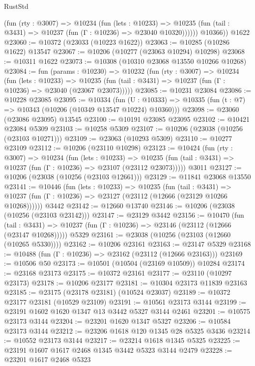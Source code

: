 \begin{lexlean}{RustStd}
\begin{coremodule}
            (fun (rty : @3007) =>
            @10234
              (fun (lets : @10233) =>
              @10235 (fun (tail : @3431) => @10237 (fun (Γ : @10236) => @23040 @10320))))))
        @10366))
    @1622
@23060 := @10372 (@23033 (@10223 @1622))
@23063 := @10285 (@10286 @1622) @13547
@23067 := @10206 (@10277 (@23063 @10294) @10298)
@23068 := @10311 @1622
@23073 := @10308 (@10310 @23068 @13550 @10266 @10268)
@23084 := fun (params : @10230) =>
  @10232
    (fun (rty : @3007) =>
    @10234
      (fun (lets : @10233) =>
      @10235 (fun (tail : @3431) => @10237 (fun (Γ : @10236) => @23040 (@23067 @23073)))))
@23085 := @10231 @23084
@23086 := @10228 @23085
@23095 := @10334
    (fun (U : @10333) => @10335 (fun (t : @7) => @10343 (@10206 (@10349 @13547 @10224) @10360)))
@23098 := @23060 (@23086 @23095) @13545
@23100 := @10191 @23085 @23095
@23102 := @10421 @23084 @5309
@23103 := @10258 @5309
@23107 := @10206 (@23038 (@10256 (@23103 @10271)))
@23109 := @23063 (@10293 @5309)
@23110 := @10277 @23109
@23112 := @10206 (@23110 @10298)
@23123 := @10424
    (fun (rty : @3007) =>
    @10234
      (fun (lets : @10233) =>
      @10235 (fun (tail : @3431) => @10237 (fun (Γ : @10236) => @23107 (@23112 @23073)))))
    @3011
@23127 := @10206 (@23038 (@10256 (@23103 @12661)))
@23129 := @11841 @23068 @13550
@23141 := @10446
    (fun (lets : @10233) =>
    @10235
      (fun (tail : @3431) =>
      @10237 (fun (Γ : @10236) => @23127 (@23112 (@12666 (@23129 @10266 @10268))))))
    @3442
@23142 := @12660 @13740
@23146 := @10206 (@23038 (@10256 (@23103 @23142)))
@23147 := @23129 @3442
@23156 := @10470
    (fun (tail : @3431) => @10237 (fun (Γ : @10236) => @23146 (@23112 (@12666 (@23147 @10268)))))
    @5329
@23161 := @23038 (@10256 (@23103 (@12660 (@10265 @5330))))
@23162 := @10206 @23161
@23163 := @23147 @5329
@23168 := @10488 (fun (Γ : @10236) => @23162 (@23112 (@12666 @23163)))
@23169 := @10506 @50
@23173 := @10501 (@10504 (@23169 @10509)) @10284
@23174 := @23168 @23173
@23175 := @10372 @23161
@23177 := @23110 (@10297 @23173)
@23178 := @10206 @23177
@23181 := @10304 @23173 @11839 @23163
@23185 := @23175 (@23178 @23181) (@10524 @23037)
@23189 := @10372 @23177 @23181 (@10529 @23109)
@23191 := @10561 @23173 @3144
@23199 := @23191 @1602 @1620 @1347 @13 @3442 @5327 @3144 @2461
@23201 := @10575 @23173 @3144
@23204 := @23201 @1620 @1347 @5327
@23206 := @10584 @23173 @3144
@23212 := @23206 @1618 @120 @1345 @28 @5325 @3436
@23214 := @10552 @23173 @3144
@23217 := @23214 @1618 @1345 @5325
@23225 := @23191 @1607 @1617 @2468 @1345 @3442 @5323 @3144 @2479
@23228 := @23201 @1617 @2468 @5323

\end{coremodule}
\end{lexlean}
